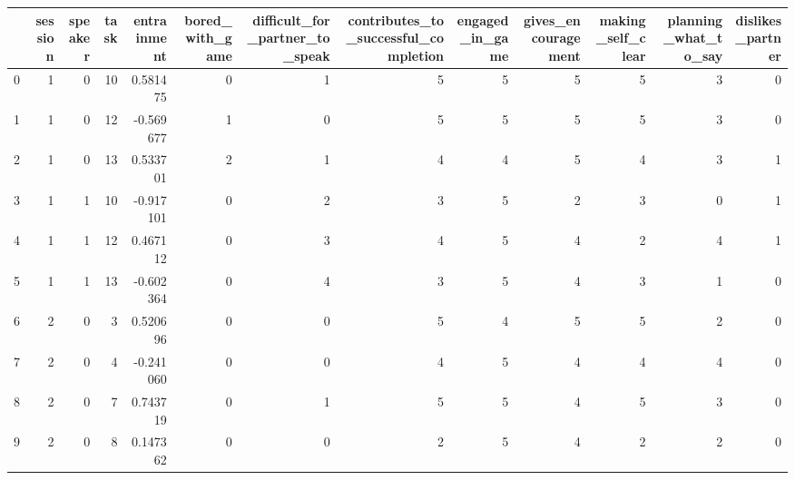 \begin{tabular}{lrrrrrrrrrrrr}
\toprule
{} &  session &  speaker &  task &  entrainment &  bored\_with\_game &  difficult\_for\_partner\_to\_speak &  contributes\_to\_successful\_completion &  engaged\_in\_game &  gives\_encouragement &  making\_self\_clear &  planning\_what\_to\_say &  dislikes\_partner \\
\midrule
0 &        1 &        0 &    10 &     0.581475 &                0 &                               1 &                                     5 &                5 &                    5 &                  5 &                     3 &                 0 \\
1 &        1 &        0 &    12 &    -0.569677 &                1 &                               0 &                                     5 &                5 &                    5 &                  5 &                     3 &                 0 \\
2 &        1 &        0 &    13 &     0.533701 &                2 &                               1 &                                     4 &                4 &                    5 &                  4 &                     3 &                 1 \\
3 &        1 &        1 &    10 &    -0.917101 &                0 &                               2 &                                     3 &                5 &                    2 &                  3 &                     0 &                 1 \\
4 &        1 &        1 &    12 &     0.467112 &                0 &                               3 &                                     4 &                5 &                    4 &                  2 &                     4 &                 1 \\
5 &        1 &        1 &    13 &    -0.602364 &                0 &                               4 &                                     3 &                5 &                    4 &                  3 &                     1 &                 0 \\
6 &        2 &        0 &     3 &     0.520696 &                0 &                               0 &                                     5 &                4 &                    5 &                  5 &                     2 &                 0 \\
7 &        2 &        0 &     4 &    -0.241060 &                0 &                               0 &                                     4 &                5 &                    4 &                  4 &                     4 &                 0 \\
8 &        2 &        0 &     7 &     0.743719 &                0 &                               1 &                                     5 &                5 &                    4 &                  5 &                     3 &                 0 \\
9 &        2 &        0 &     8 &     0.147362 &                0 &                               0 &                                     2 &                5 &                    4 &                  2 &                     2 &                 0 \\
\bottomrule
\end{tabular}
